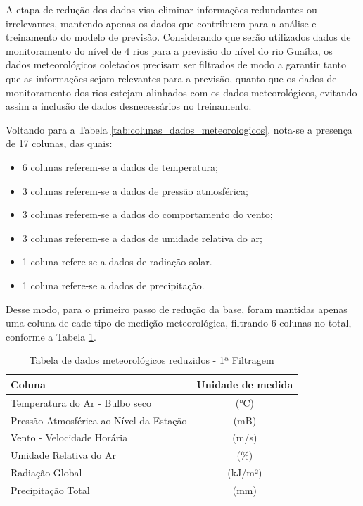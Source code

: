 A etapa de redução dos dados visa eliminar informações redundantes ou irrelevantes, mantendo apenas os dados que contribuem para a análise e treinamento do modelo de previsão. Considerando que serão utilizados dados de monitoramento do nível de 4 rios para a previsão do nível do rio Guaíba, os dados meteorológicos coletados precisam ser filtrados de modo a garantir tanto que as informações sejam relevantes para a previsão, quanto que os dados de monitoramento dos rios estejam alinhados com os dados meteorológicos, evitando assim a inclusão de dados desnecessários no treinamento. 

Voltando para a Tabela \ref{tab:colunas_dados_meteorologicos}, nota-se a presença de 17 colunas, das quais:

\begin{itemize}
	\item 6 colunas referem-se a dados de temperatura;
	\item 3 colunas referem-se a dados de pressão atmosférica;
	\item 3 colunas referem-se a dados do comportamento do vento;
	\item 3 colunas referem-se a dados de umidade relativa do ar;
	\item 1 coluna refere-se a dados de radiação solar.
	\item 1 coluna refere-se a dados de precipitação.
\end{itemize}

Desse modo, para o primeiro passo de redução da base, foram mantidas apenas uma coluna de cade tipo de medição meteorológica, filtrando 6 colunas no total, conforme a Tabela \ref{tab:colunas_dados_meteorologicos_reduzidas}. 

\begin{table}[H]
	\centering
	\begin{tabular}{|p{10cm}|c|}
	\hline
	\textbf{Coluna} & \textbf{Unidade de medida} \\
	\hline
	Temperatura do Ar - Bulbo seco & (°C) \\
	Pressão Atmosférica ao Nível da Estação & (mB) \\
	Vento - Velocidade Horária & (m/s) \\
	Umidade Relativa do Ar & (\%) \\
	Radiação Global & (kJ/m²) \\
	Precipitação Total & (mm) \\
	\hline
	\end{tabular}
	\caption{Tabela de dados meteorológicos reduzidos - 1ª Filtragem}
	\label{tab:colunas_dados_meteorologicos_reduzidas}
\end{table}

